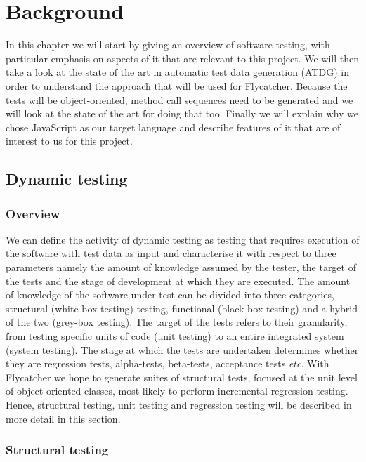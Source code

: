 \documentclass[a4paper,11pt,titlepage]{report}
\begin{document}
\chapter{Background}
In this chapter we will start by giving an overview of software testing, with particular emphasis on aspects of it that are relevant to this project. We will then take a look at the state of the art in automatic test data generation (ATDG) in order to understand the approach that will be used for Flycatcher. Because the tests will be object-oriented, method call sequences need to be generated and we will look at the state of the art for doing that too. Finally we will explain why we chose JavaScript as our target language and describe features of it that are of interest to us for this project.

\section{Dynamic testing}

\subsection{Overview}

We can define the activity of dynamic testing as testing that requires execution of the software with test data as input \cite{mahmood2007systematic} and characterise it with respect to three parameters namely the amount of knowledge assumed by the tester, the target of the tests and the stage of development at which they are executed. The amount of knowledge of the software under test can be divided into three categories, structural (white-box testing) testing, functional (black-box testing) and a hybrid of the two (grey-box testing). The target of the tests refers to their granularity, from testing specific units of code (unit testing) to an entire integrated system (system testing). The stage at which the tests are undertaken determines whether they are regression tests, alpha-tests, beta-tests, acceptance tests \emph{etc}. With Flycatcher we hope to generate suites of structural tests, focused at the unit level of object-oriented classes, most likely to perform incremental regression testing. Hence, structural testing, unit testing and regression testing will be described in more detail in this section.

\subsection{Structural testing}
\end{document}

